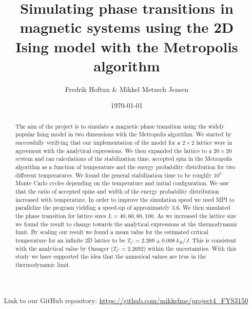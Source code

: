 \documentclass[%
 reprint,
nofootinbib,
aps,
]{revtex4-1}
\begin{document}
\title{Simulating phase transitions in magnetic systems using the 2D Ising model with the Metropolis algorithm}
\author{Fredrik Hoftun \& Mikkel Metzsch Jensen}

\date{\today}



\begin{abstract}
   The aim of the project is to simulate a magnetic phase transition using the widely popular Ising model in two dimensions with the Metropolis algorithm. We started by successfully verifying that our implementation of the model for a $2 \times 2$ lattice were in agreement with the analytical expressions. We then expanded the lattice to a $20\times20$ system and ran calculations of the stabilization time, accepted spin in the Metropolis algorithm as a function of temperature and the energy probability distribution for two different temperatures. We found the general stabilization time to be roughly $10^5$ Monte Carlo cycles depending on the temperature and initial configuration. We saw that the ratio of accepted spins and width of the energy probability distribution increased with temperature. In order to improve the simulation speed we used MPI to parallelize the program yielding a speed-up of approximately $3.6$. We then simulated the phase transition for lattice sizes $L = 40, 60, 80, 100$. As we increased the lattice size we found the result to change towards the analytical expressions at the thermodynamic limit. By scaling our result we found a mean value for the estimated critical temperature for an infinite 2D lattice to be $T_C = 2.269 \pm 0.008 \ k_B/J$. This is consistent with the analytical value by Onsager ($T_C = 2.2692$) within the uncertainties. With this study we have supported the idea that the numerical values are true in the thermodynamic limit.

\end{abstract}

\vfill
\footnotesize{{Link to our GitHub repository: \url{https://github.com/mikkelme/project4_FYS3150}}}
\maketitle
\newpage
\end{document}
